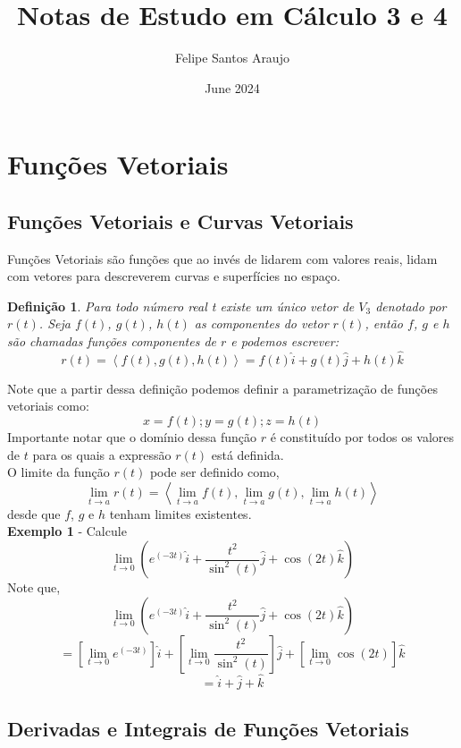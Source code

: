 \documentclass[a4paper,12pt]{article}
\title{Notas de Estudo em Cálculo 3 e 4}
\author{Felipe Santos Araujo}
\date{June 2024}
\begin{document}
\maketitle

\newpage
\tableofcontents{}

\newpage
\section{Funções Vetoriais}
\subsection{Funções Vetoriais e Curvas Vetoriais}
    \newtheorem{definition}{Definição}
    Funções Vetoriais são funções que ao invés de lidarem com valores reais, lidam com vetores para descreverem curvas e superfícies no espaço.
        \begin{definition}
            Para todo número real \textit{t} existe um único vetor de $V_3$ denotado por $r(t)$. Seja $f(t)$, $g(t)$, $h(t)$ as componentes do vetor $r(t)$, então $f$, $g$ e $h$ são chamadas funções componentes de $r$ e podemos escrever:
            \[r(t) = \left<f(t), g(t), h(t) \right> = f(t)\hat{i} + g(t)\hat{j} + h(t)\hat{k}\]
        \end{definition}
    Note que a partir dessa definição podemos definir a parametrização de funções vetoriais como:
    \[x = f(t);     y = g(t);   z = h(t)\]
    Importante notar que o domínio dessa função $r$ é constituído por todos os valores de $t$ para os quais a expressão $r(t)$ está definida.\\

    O limite da função $r(t)$ pode ser definido como,
    \[\lim_{t \to a} r(t) = \left<\lim_{t \to a}f(t), \lim_{t \to a}g(t), \lim_{t \to a}h(t) \right>\]
    desde que $f$, $g$ e $h$ tenham limites existentes.\\
    \textbf{Exemplo 1} - Calcule
    \[\lim_{t \to 0} (e^{(-3t)}\hat{i} + \frac{t^2}{\sin^2{(t)}}\hat{j} + \cos{(2t)}\hat{k})\]
    Note que,
     \[\lim_{t \to 0} (e^{(-3t)}\hat{i} + \dfrac{t^2}{\sin^2{(t)}}\hat{j} + \cos{(2t)}\hat{k})\]
     \[= [\lim_{t \to 0}e^{(-3t)}]\hat{i} + [\lim_{t \to 0}\frac{t^2}{\sin^2{(t)}}]\hat{j} + [\lim_{t \to 0}\cos{(2t)}]\hat{k}\]
     \[= \hat{i} + \hat{j} + \hat{k}\]
\newpage
\subsection{Derivadas e Integrais de Funções Vetoriais}
\end{document}
